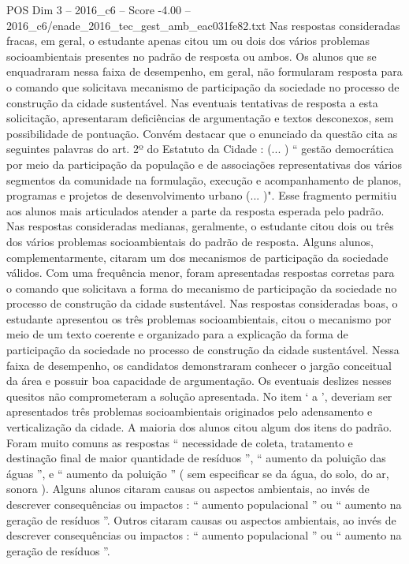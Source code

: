 \begin{textsample}{POS Dim 3 – 2016\_c6 – Score -4.00 – 2016\_c6/enade\_2016\_tec\_gest\_amb\_eac031fe82.txt}
Nas respostas consideradas fracas, em geral, o estudante apenas citou um ou dois dos vários problemas socioambientais presentes no padrão de resposta ou ambos.
Os alunos que se enquadraram nessa faixa de desempenho, em geral, não formularam resposta para o comando que solicitava mecanismo de participação da sociedade no processo de construção da cidade sustentável.
Nas eventuais tentativas de resposta a esta solicitação, apresentaram deficiências de argumentação e textos desconexos, sem possibilidade de pontuação.
Convém destacar que o enunciado da questão cita as seguintes palavras do art. 2º do Estatuto da Cidade : (... ) “ gestão democrática por meio da participação da população e de associações representativas dos vários segmentos da comunidade na formulação, execução e acompanhamento de planos, programas e projetos de desenvolvimento urbano (... )".
Esse fragmento permitiu aos alunos mais articulados atender a parte da resposta esperada pelo padrão.
Nas respostas consideradas medianas, geralmente, o estudante citou dois ou três dos vários problemas socioambientais do padrão de resposta.
Alguns alunos, complementarmente, citaram um dos mecanismos de participação da sociedade válidos.
Com uma frequência menor, foram apresentadas respostas corretas para o comando que solicitava a forma do mecanismo de participação da sociedade no processo de construção da cidade sustentável.
Nas respostas consideradas boas, o estudante apresentou os três problemas socioambientais, citou o mecanismo por meio de um texto coerente e organizado para a explicação da forma de participação da sociedade no processo de construção da cidade sustentável.
Nessa faixa de desempenho, os candidatos demonstraram conhecer o jargão conceitual da área e possuir boa capacidade de argumentação.
Os eventuais deslizes nesses quesitos não comprometeram a solução apresentada.
No item ‘ a ’, deveriam ser apresentados três problemas socioambientais originados pelo adensamento e verticalização da cidade.
A maioria dos alunos citou algum dos itens do padrão.
Foram muito comuns as respostas “ necessidade de coleta, tratamento e destinação final de maior quantidade de resíduos ”, “ aumento da poluição das águas ”, e “ aumento da poluição ” ( sem especificar se da água, do solo, do ar, sonora ).
Alguns alunos citaram causas ou aspectos ambientais, ao invés de descrever consequências ou impactos : “ aumento populacional ” ou “ aumento na geração de resíduos ”.
Outros citaram causas ou aspectos ambientais, ao invés de descrever consequências ou impactos : “ aumento populacional ” ou “ aumento na geração de resíduos ”.

\end{textsample}
